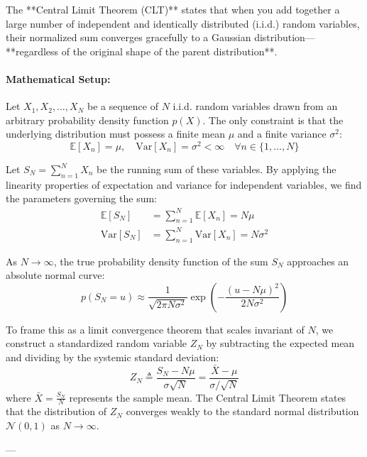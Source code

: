 \documentclass{article}
\begin{document}
The **Central Limit Theorem (CLT)** states that when you add together a large number of independent and identically distributed (i.i.d.) random variables, their normalized sum converges gracefully to a Gaussian distribution—**regardless of the original shape of the parent distribution**.

\paragraph{Mathematical Setup:}
Let $X_1, X_2, \dots, X_N$ be a sequence of $N$ i.i.d. random variables drawn from an arbitrary probability density function $p(X)$. The only constraint is that the underlying distribution must possess a finite mean $\mu$ and a finite variance $\sigma^2$:
\begin{equation*}
\mathbb{E}[X_n] = \mu, \quad \text{Var}[X_n] = \sigma^2 < \infty \quad \forall n \in \{1, \dots, N\}
\end{equation*}

Let $S_N = \sum_{n=1}^N X_n$ be the running sum of these variables. By applying the linearity properties of expectation and variance for independent variables, we find the parameters governing the sum:
\begin{align*}
\mathbb{E}[S_N] &= \sum_{n=1}^N \mathbb{E}[X_n] = N\mu \\
\text{Var}[S_N] &= \sum_{n=1}^N \text{Var}[X_n] = N\sigma^2
\end{align*}

As $N \to \infty$, the true probability density function of the sum $S_N$ approaches an absolute normal curve:
\begin{equation}
p(S_N = u) \approx \frac{1}{\sqrt{2\pi N \sigma^2}} \exp\left( -\frac{(u - N\mu)^2}{2N\sigma^2} \right) \tag{233}
\end{equation}

To frame this as a limit convergence theorem that scales invariant of $N$, we construct a standardized random variable $Z_N$ by subtracting the expected mean and dividing by the systemic standard deviation:
\begin{equation}
Z_N \triangleq \frac{S_N - N\mu}{\sigma \sqrt{N}} = \frac{\bar{X} - \mu}{\sigma / \sqrt{N}} \tag{234}
\end{equation}
where $\bar{X} = \frac{S_N}{N}$ represents the sample mean. The Central Limit Theorem states that the distribution of $Z_N$ converges weakly to the standard normal distribution $\mathcal{N}(0, 1)$ as $N \to \infty$.

---
\end{document}
